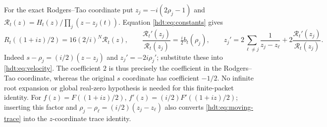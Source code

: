 For the exact Rodgers--Tao coordinate put
$z_j=-i(2\rho_j-1)$ and
$\mathcal R_t(z)=H_t(z)/\prod_j(z-z_j(t))$.
Equation \eqref{hdt:eq:constants} gives
\begin{equation}\label{hdt:eq:RT-coordinate}
R_t((1+iz)/2)=16(2/i)^N\mathcal R_t(z),\qquad
\frac{\mathcal R_t'(z_j)}{\mathcal R_t(z_j)}
=\tfrac i2 b_t(\rho_j),\qquad
z_j'=2\sum_{\ell\ne j}\frac1{z_j-z_\ell}
+2\frac{\mathcal R_t'(z_j)}{\mathcal R_t(z_j)}.
\end{equation}
Indeed $s-\rho_j=(i/2)(z-z_j)$ and $z_j'=-2i\rho_j'$;
substitute these into \eqref{hdt:eq:velocity}. The coefficient $2$
is thus precisely the coefficient in the Rodgers--Tao coordinate,
whereas the original $s$ coordinate has coefficient $-1/2$.
No infinite root expansion or global real-zero hypothesis is needed
for this finite-packet identity. For $f(z)=F((1+iz)/2)$,
$f'(z)=(i/2)F'((1+iz)/2)$; inserting this factor and
$\rho_j-\rho_\ell=(i/2)(z_j-z_\ell)$ also converts
\eqref{hdt:eq:moving-trace} into the $z$-coordinate trace identity.

